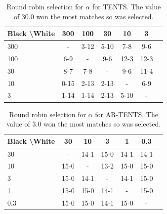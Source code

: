     \begin{table}[tbp]
    \centering
        \begin{tabular}{l|cccccc}
            \textbf{Black \textbackslash White}     & 300  & 100   & 30   & 10    & 3    \\ 
            \hline
                                    300            & -     	&  3-12 		&  5-10 		&  7-8 		& 9-6  		\\
                                    100            &  6-9 		& -     	&  9-6		&  12-3 		& 12-3  		\\
                                    30          & 8-7   	&  7-8  	&   -   &  9-6 		&  11-4 		\\
                                    10          &  0-15 		&  2-13 		& 2-13  		& -     	& 6-9  		\\
                                    3         &  1-14 		& 1-14  		& 2-13  		&  5-10 		&   -   	\\    
        \end{tabular}
        \caption[Round robin  selection for $\alpha$ for TENTS.]{Round robin  selection for $\alpha$ for TENTS. The value of 30.0 won the most matches so was selected. \label{tab:w060}}
    \end{table}
    
    \begin{table}[tbp]
    \centering
        \begin{tabular}{l|cccccc}
            \textbf{Black \textbackslash White}     & 30  & 10   & 3   & 1    & 0.3    \\ 
            \hline
                                    30            & -     	&  14-1 		& 15-0  		& 14-1  		& 14-1  		\\
                                    10            &  15-0 		& -     	&  13-2		& 15-0  		&  15-0 		\\
                                    3          &  15-0  	&   14-1 	&   -   &  14-1 		&  15-0 		\\
                                    1          &   	15-0	&  15-0 		&  14-1 		& -     	& 15-0  		\\
                                    0.3         &   15-0		&   	15-0	&   14-1		& 15-0  		&   -   	\\    
        \end{tabular}
        \caption[Round robin  selection for $\alpha$ for AR-TENTS.]{Round robin  selection for $\alpha$ for AR-TENTS. The value of 3.0 won the most matches so was selected. \label{tab:x060}}
    \end{table}
    
